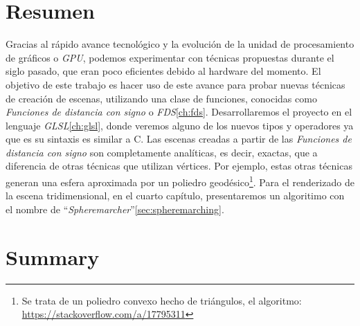 \thispagestyle{empty}

\chapter*{Resumen}

Gracias al rápido avance tecnológico y la evolución de la unidad de procesamiento de gráficos o \textit{GPU}, podemos experimentar con técnicas propuestas durante el siglo pasado, que eran poco eficientes debido al hardware del momento. El objetivo de este trabajo es hacer uso de este avance para probar nuevas técnicas de creación de escenas, utilizando una clase de funciones, conocidas como \textit{Funciones de distancia con signo} o \textit{FDS}\ref{ch:fds}. Desarrollaremos el proyecto en el lenguaje \textit{GLSL}\ref{ch:glsl}, donde veremos alguno de los nuevos tipos y operadores ya que es su sintaxis es similar a C. Las escenas creadas a partir de las \textit{Funciones de distancia con signo} son completamente analíticas, es decir, exactas, que a diferencia de otras técnicas que utilizan vértices. Por ejemplo, estas otras técnicas generan una esfera aproximada por un poliedro geodésico\footnote{Se trata de un poliedro convexo hecho de triángulos, el algoritmo: \url{https://stackoverflow.com/a/17795311}}. Para el renderizado de la escena tridimensional, en el cuarto capítulo, presentaremos un algoritimo con el nombre de \enquote{\textit{Spheremarcher}}\ref{sec:spheremarching}.

\vspace{0.7cm}


\cleardoublepage

\chapter*{Summary}


